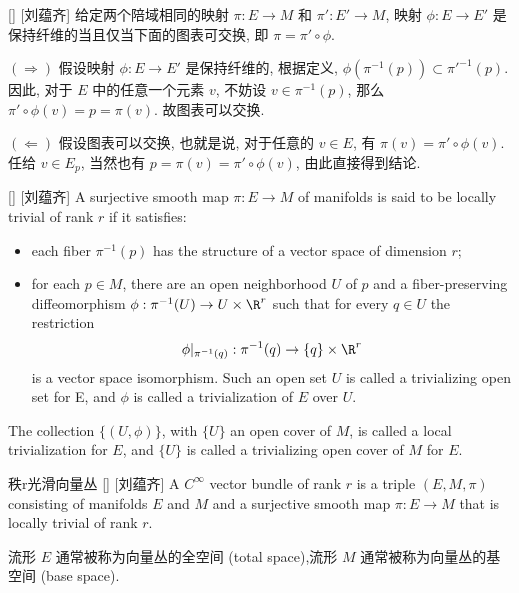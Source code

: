 \documentclass[UTF8]{ctexart}
\begin{document}
        \begin{ppt}
            []
            {}
            []
            [刘蕴齐]
            给定两个陪域相同的映射 \(\pi: E \rightarrow M\) 和 \(\pi': E' \rightarrow M\), 映射 \(\phi: E \rightarrow E'\) 是保持纤维的当且仅当下面的图表可交换, 即 \(\pi = \pi' \circ \phi\). 
        \end{ppt}

        \begin{prf}
             \((\Rightarrow)\)  假设映射 \(\phi: E \rightarrow E'\) 是保持纤维的, 根据定义,  \(\phi(\pi^{-1}(p)) \subset \pi'^{-1}(p)\). 因此, 对于 \(E\) 中的任意一个元素 \(v\), 不妨设 \(v \in \pi^{-1}(p)\), 那么 \(\pi' \circ \phi (v) = p = \pi(v)\). 故图表可以交换. 
            
             \((\Leftarrow)\)  假设图表可以交换, 也就是说, 对于任意的 \(v \in  E\), 有 \(\pi(v) = \pi' \circ \phi(v)\). 任给 \(v \in E_p\), 当然也有 \(p = \pi(v) = \pi' \circ \phi(v)\), 由此直接得到结论. 
        \end{prf}

        \begin{dfn}
            []
            {}
            []
            [刘蕴齐]
            A surjective smooth map  \(\pi: E \rightarrow M\)  of manifolds is said to be locally trivial of rank  \(r\)  if
            it satisfies:
            \begin{itemize}
                \item each fiber  \(\pi^{-1}(p)\)  has the structure of a vector space of dimension  \(r\);
                \item  for each  \(p \in M\), there are an open neighborhood  \(U\)  of  \(p\)  and a fiber-preserving diffeomorphism  \(\phi: \pi^{-1}(U) \rightarrow U \times \R^r\)  such that for every  \(q \in U\)  the restriction
                \[
                    \phi | _{\pi^{-1}(q)}: \pi^{-1}(q) \rightarrow \{q\} \times \R^r
                \]
                is a vector space isomorphism. Such an open set  \(U\)  is called a trivializing open set for E, and  \(\phi\)  is called a trivialization of  \(E\)  over  \(U\).
            \end{itemize}
            The collection  \(\{(U,\phi)\}\), with  \(\{U\}\)  an open cover of  \(M\), is called a local trivialization for  \(E\), and  \(\{U\}\)  is called a trivializing open cover of  \(M\)  for  \(E\).
        \end{dfn}
        
        \begin{dfn}
            []
            {秩r光滑向量丛}
            []
            [刘蕴齐]
            A  \(C^{\infty}\)  vector bundle of rank  \(r\)  is a triple  \((E,M,\pi)\)  consisting of manifolds  \(E\)  and  \(M\)  and a surjective smooth map 
             \(\pi: E \rightarrow M\)  that is locally trivial of rank  \(r\). 
            
            流形 \(E\) 通常被称为向量丛的全空间 (total space),流形 \(M\) 通常被称为向量丛的基空间 (base space). 
        \end{dfn}
\end{document}
